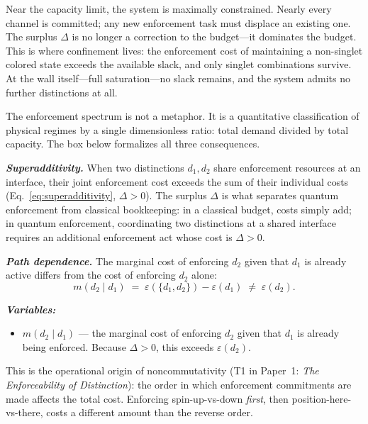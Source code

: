 \documentclass[11pt]{article}
\newenvironment{varlist}{\begin{itemize}[nosep,leftmargin=2em]}{\end{itemize}}
\begin{document}
Near the capacity limit, the system is maximally constrained.  Nearly every channel is committed; any new enforcement task must displace an existing one.  The surplus $\Delta$ is no longer a correction to the budget---it dominates the budget.  This is where confinement lives: the enforcement cost of maintaining a non-singlet colored state exceeds the available slack, and only singlet combinations survive.  At the wall itself---full saturation---no slack remains, and the system admits no further distinctions at all.

The enforcement spectrum is not a metaphor.  It is a quantitative classification of physical regimes by a single dimensionless ratio: total demand divided by total capacity.  The box below formalizes all three consequences.


\begin{tcolorbox}[apfbox, title={Consequences of $L_{\mathrm{nc}}^{\mathrm{interf}}$: Superadditivity, Path Dependence, Saturation}]

\textbf{\textit{Superadditivity.}}  When two distinctions $d_1, d_2$ share enforcement resources at an interface, their joint enforcement cost exceeds the sum of their individual costs (Eq.~\ref{eq:superadditivity}, $\Delta > 0$).  The surplus $\Delta$ is what separates quantum enforcement from classical bookkeeping: in a classical budget, costs simply add; in quantum enforcement, coordinating two distinctions at a shared interface requires an additional enforcement act whose cost is $\Delta > 0$.

\medskip
\textbf{\textit{Path dependence.}}  The marginal cost of enforcing $d_2$ given that $d_1$ is already active differs from the cost of enforcing $d_2$ alone:
\begin{equation}
m(d_2 \mid d_1) \;=\; \varepsilon(\{d_1, d_2\}) - \varepsilon(d_1) \;\ne\; \varepsilon(d_2).
\label{eq:path_dependence}
\end{equation}

\smallskip\noindent\textbf{\textit{Variables:}}
\begin{varlist}
\item $m(d_2 \mid d_1)$ --- the marginal cost of enforcing $d_2$ given that $d_1$ is already being enforced.  Because $\Delta > 0$, this exceeds $\varepsilon(d_2)$.
\end{varlist}

This is the operational origin of noncommutativity (T1 in Paper~1: \emph{The Enforceability of Distinction}): the order in which enforcement commitments are made affects the total cost.  Enforcing spin-up-vs-down \emph{first}, then position-here-vs-there, costs a different amount than the reverse order.


\end{tcolorbox}
\end{document}
